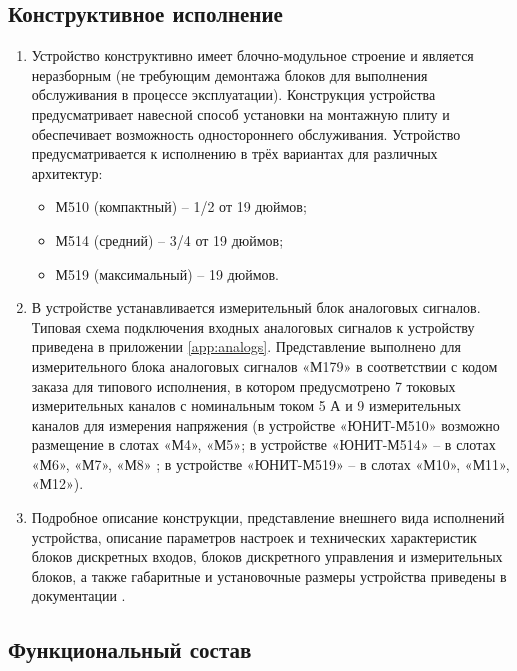 \color{unidarkgreen}\subsection{Конструктивное исполнение}
\color{black}

\begin{enumerate}

\item
Устройство конструктивно имеет блочно-модульное строение и является неразборным (не требующим демонтажа блоков для выполнения обслуживания в процессе эксплуатации). 
Конструкция устройства предусматривает навесной способ установки на монтажную плиту и обеспечивает возможность одностороннего обслуживания.
Устройство предусматривается к исполнению в трёх вариантах для различных архитектур:
\begin{itemize}
\item М510 (компактный) – 1/2 от 19 дюймов;
\item М514 (средний) – 3/4 от 19 дюймов;
\item М519 (максимальный) – 19 дюймов.
\end{itemize}

\item
В устройстве устанавливается измерительный блок аналоговых сигналов. Типовая схема подключения входных аналоговых сигналов к устройству приведена в приложении \ref{app:analogs}. Представление выполнено для измерительного блока аналоговых сигналов «М179» в соответствии с кодом заказа для типового исполнения, в котором предусмотрено 7 токовых измерительных каналов с номинальным током 5 А и 9 измерительных каналов для измерения напряжения (в устройстве «ЮНИТ-М510» возможно размещение в слотах «М4», «М5»; в устройстве «ЮНИТ-М514» -- в слотах «М6», «М7», «М8» ; в устройстве «ЮНИТ-М519» -- в слотах «М10», «М11», «М12»).

\item
Подробное описание конструкции, представление внешнего вида исполнений устройства, описание параметров настроек и технических характеристик блоков дискретных входов, блоков дискретного управления и измерительных блоков, а также габаритные и установочные размеры устройства приведены в документации \ManualUnitGeneral.

\end{enumerate}

\color{unidarkgreen}\subsection{Функциональный состав}
\color{black}

